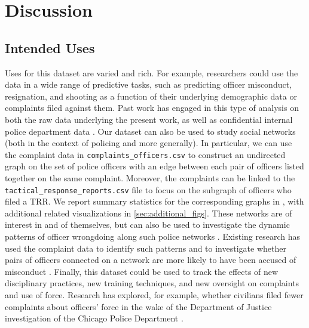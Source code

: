 \section{Discussion} \label{sec:discussion}

\subsection{Intended Uses}
Uses for this dataset are varied and rich. For example, researchers could use
the data in a wide range of predictive tasks, such as predicting officer
misconduct, resignation, and shooting as a function of their underlying
demographic data or complaints filed against them. Past work has engaged in
this type of analysis on both the raw data underlying the present work, as well
as confidential internal police department data \cite{Helsby18,Rozema19}.  Our
dataset can also be used to study social networks (both in the context of
policing and more generally). In particular, we can use the complaint data in
\texttt{complaints\_officers.csv} to construct an undirected graph on the set
of police officers with an edge between each pair of officers listed together
on the same complaint. Moreover, the complaints can be linked to the
\texttt{tactical\_response\_reports.csv} file to focus on the subgraph of
officers who filed a TRR. We report summary statistics for the corresponding
graphs in , with additional related visualizations in
\cref{sec:additional_figs}.  These networks are of interest in and of
themselves, but can also be used to investigate the dynamic patterns of officer
wrongdoing along such police networks \cite{Roithmayr16}. Existing research has
used the complaint data to identify such patterns and to investigate whether
pairs of officers connected on a network are more likely to have been accused
of misconduct \cite{Ouellet19}.  Finally, this dataset could be used to track
the effects of new disciplinary practices, new training techniques, and new
oversight on complaints and use of force. Research has explored, for
example, whether civilians filed fewer complaints about officers' force in the
wake of the Department of Justice investigation of the Chicago Police
Department \cite{Travers20}. 



